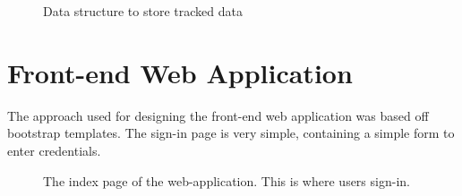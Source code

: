 \vspace*{\fill}

\begin{figure}[H]
  \centering
  \caption[Tracked data structure]{Data structure to store tracked data}
  \label{fig:tracked-data-uml-class}
\end{figure}

\vspace*{\fill}

\newpage

\section{Front-end Web Application}
The approach used for designing the front-end web application was based off bootstrap templates. The sign-in page is very simple, containing a simple form to enter credentials.

\begin{figure}[H]
  \centering
  \caption[Web Sign-in Page]{The index page of the web-application. This is where users sign-in.}
  \label{fig:web-sign-in-page}
\end{figure}

